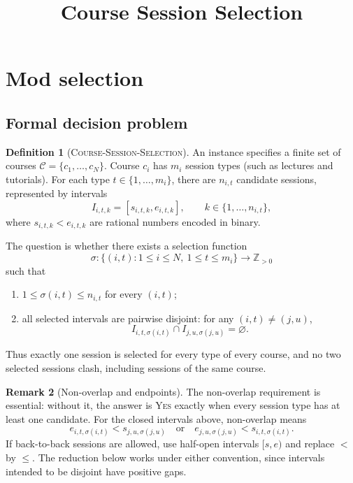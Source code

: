 \documentclass[10pt]{article}
\title{Course Session Selection}
\author{}
\date{}
\theoremstyle{definition}
\newtheorem{definition}{Definition}[section]
\newtheorem{remark}[definition]{Remark}
\newcommand{\YES}{\textsc{Yes}}
\begin{document}
\maketitle
\tableofcontents
\newpage

\section{Mod selection}
\subsection{Formal decision problem}

\begin{definition}[\textsc{Course-Session-Selection}]
An instance specifies a finite set of courses
$\mathcal{C}=\{c_1,\ldots,c_N\}$. Course $c_i$ has $m_i$ session types
(such as lectures and tutorials). For each type $t\in\{1,\ldots,m_i\}$,
there are $n_{i,t}$ candidate sessions, represented by intervals
\[
  I_{i,t,k}=[s_{i,t,k},e_{i,t,k}],
  \qquad k\in\{1,\ldots,n_{i,t}\},
\]
where $s_{i,t,k}<e_{i,t,k}$ are rational numbers encoded in binary.

The question is whether there exists a selection function
\[
  \sigma:\{(i,t):1\leq i\leq N,\ 1\leq t\leq m_i\}
  \longrightarrow \mathbb{Z}_{>0}
\]
such that
\begin{enumerate}[label=(\roman*)]
  \item $1\leq\sigma(i,t)\leq n_{i,t}$ for every $(i,t)$;
  \item all selected intervals are pairwise disjoint: for any
  $(i,t)\neq(j,u)$,
  \[
    I_{i,t,\sigma(i,t)}\cap I_{j,u,\sigma(j,u)}=\varnothing.
  \]
\end{enumerate}
Thus exactly one session is selected for every type of every course,
and no two selected sessions clash, including sessions of the same course.
\end{definition}

\begin{remark}[Non-overlap and endpoints]
The non-overlap requirement is essential: without it, the answer is
\YES{} exactly when every session type has at least one candidate.
For the closed intervals above, non-overlap means
\[
  e_{i,t,\sigma(i,t)}<s_{j,u,\sigma(j,u)}
  \quad\text{or}\quad
  e_{j,u,\sigma(j,u)}<s_{i,t,\sigma(i,t)}.
\]
If back-to-back sessions are allowed, use half-open intervals $[s,e)$
and replace $<$ by $\leq$. The reduction below works under either convention,
since intervals intended to be disjoint have positive gaps.
\end{remark}
\end{document}
